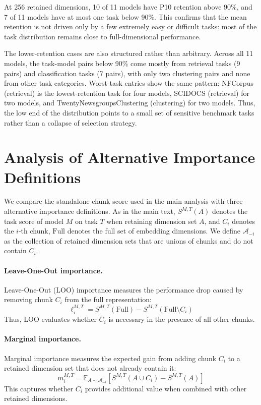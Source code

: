 \documentclass[11pt]{article}
\begin{document}
At 256 retained dimensions, 10 of 11 models have P10 retention above 90\%, and 7 of 11 models have at most one task below 90\%. This confirms that the mean retention is not driven only by a few extremely easy or difficult tasks: most of the task distribution remains close to full-dimensional performance.

The lower-retention cases are also structured rather than arbitrary. Across all 11 models, the task-model pairs below 90\% come mostly from retrieval tasks (9 pairs) and classification tasks (7 pairs), with only two clustering pairs and none from other task categories. Worst-task entries show the same pattern: NFCorpus (retrieval) is the lowest-retention task for four models, SCIDOCS (retrieval) for two models, and TwentyNewsgroupsClustering (clustering) for two models. Thus, the low end of the distribution points to a small set of sensitive benchmark tasks rather than a collapse of selection strategy.

\section{Analysis of Alternative Importance Definitions}
\label{sec:loo}

We compare the standalone chunk score used in the main analysis with three alternative importance definitions. As in the main text, $S^{M,T}(A)$ denotes the task score of model $M$ on task $T$ when retaining dimension set $A$, and $C_i$ denotes the $i$-th chunk, $\mathrm{Full}$ denotes the full set of embedding dimensions. We define $\mathcal{A}_{-i}$ as the collection of retained dimension sets that are unions of chunks and do not contain $C_i$.

\paragraph{Leave-One-Out importance.}
Leave-One-Out (LOO) importance measures the performance drop caused by removing chunk $C_i$ from the full representation:
\begin{equation}
\ell_i^{M,T}
=
S^{M,T}(\mathrm{Full})
-
S^{M,T}(\mathrm{Full}\setminus C_i)
\label{eq:loo_importance}
\end{equation}
Thus, LOO evaluates whether $C_i$ is necessary in the presence of all other chunks.

\paragraph{Marginal importance.}
Marginal importance measures the expected gain from adding chunk $C_i$ to a retained dimension set that does not already contain it:
\begin{equation}
m_i^{M,T}
=
\mathbb{E}_{A\sim \mathcal{A}_{-i}}
\left[
S^{M,T}(A\cup C_i)
-
S^{M,T}(A)
\right]
\label{eq:marginal_importance}
\end{equation}
This captures whether $C_i$ provides additional value when combined with other retained dimensions.
\end{document}
